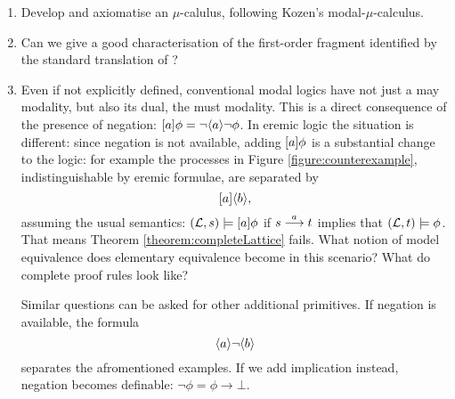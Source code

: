 \begin{enumerate}
\item Develop and axiomatise an \ELABR{} $\mu$-calulus, following
  Kozen's modal-$\mu$-calculus.

\item Can we give a good characterisation of the first-order fragment
  identified by the standard translation of \ELFULL{}?
  
\item Even if not explicitly defined, conventional modal logics have
  not just a may modality, but also its dual, the must modality. This
  is a direct consequence of the presence of negation: $[ a ] \phi
  = \neg \langle a \rangle \neg \phi$. In eremic logic the situation is
  different: since negation is not available, adding $[ a ] \phi$
  is a substantial change to the logic: for example the processes in
  Figure \ref{figure:counterexample}, indistinguishable by eremic
  formulae, are separated by 
  \[
     [ a ] \langle b \rangle,
  \]
  assuming the usual semantics: $(\mathcal{L}, s) \models [ a ] \phi$ if
  $s \stackrel{a}{\longrightarrow} t$ implies that $(\mathcal{L}, t) \models \phi$. That means
  Theorem \ref{theorem:completeLattice} fails. What notion of model
  equivalence does elementary equivalence become in this scenario?
  What do complete proof rules look like?

  Similar questions can be asked for other additional primitives. If negation is 
  available, the formula
  \[
     \langle a \rangle \neg \langle b \rangle
  \]
  separates the afromentioned examples. If we add implication instead,
  negation becomes definable: $\neg \phi = \phi \rightarrow \bot$.


\end{enumerate}


